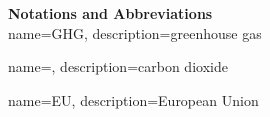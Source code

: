 \clearpage %

\noindent

{\Huge{\bf{Notations and Abbreviations}}}\
\\[6pt] 

{
    name=GHG,
    description={greenhouse gas}
}

{
    name=,
    description={carbon dioxide}
}

{
    name=EU,
    description={European Union}
}

\printglossaries

\newpage